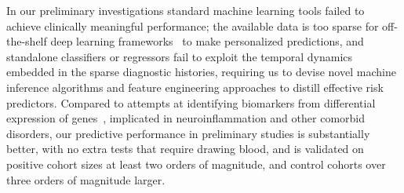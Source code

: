 \documentclass[onecolumn, compsoc,11pt]{IEEEtran}
\makeatletter
\renewcommand\paragraph{\@startsection {section}{1}{\z@}%
                                   {-.1ex \@plus -.5ex \@minus -.2ex}%
                                   {0.0ex \@plus.5ex}%
                                   {\fontsize{11}{10}\selectfont\bfseries\itshape\sffamily\color{black}}}
\def\treatment{positive\xspace}
\makeatother
\begin{document}

% 
In our preliminary investigations  standard machine learning  tools failed to achieve clinically meaningful performance; the available data is too sparse for  off-the-shelf deep learning frameworks~\cite{pmid27185194} to make personalized predictions, and standalone classifiers or regressors fail to exploit the temporal dynamics embedded in the sparse diagnostic histories, requiring us to devise novel machine inference algorithms and feature engineering approaches to distill effective risk predictors.
%
Compared to  attempts at identifying  biomarkers from differential expression  of
 genes~\cite{pmid22917206,pmid25739104,pmid24363828,pmid23227143},
 implicated in  neuroinflammation and other comorbid disorders, our predictive performance in preliminary studies is substantially better, with no extra tests that require drawing blood, and is validated on \treatment cohort sizes at least two orders of magnitude, and control cohorts over three orders of magnitude larger.
\end{document}
